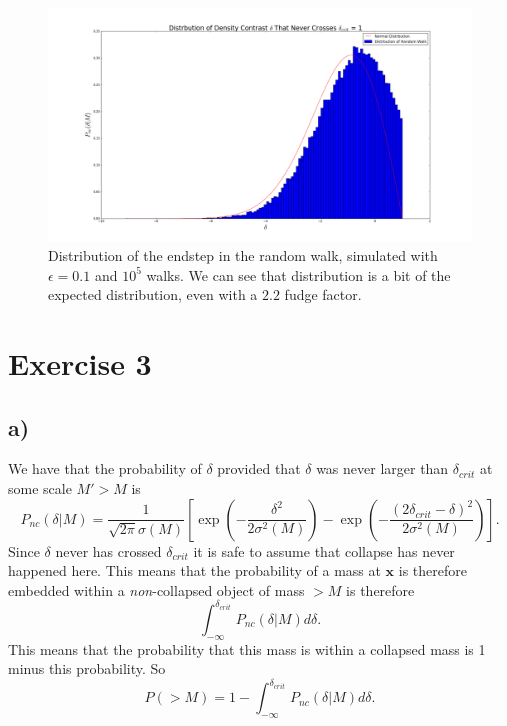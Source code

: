 \documentclass[a4paper,norsk, 10pt]{article}
\begin{document}
\begin{figure}[H]
\centering
\includegraphics[scale=0.3]{dist_under_crit}
\caption{Distribution of the endstep in the random walk, simulated with $\epsilon = 0.1$ and $10^5$ walks. We can see that distribution is a bit of the expected distribution, even with a $2.2$ fudge factor.}\label{fig:restricted_walk}
\end{figure}


\section{Exercise 3}

\subsection{a)}
We have that the probability of $\delta$ provided that $\delta$ was never larger than $\delta_{crit}$ at some scale $M' > M$ is
\begin{equation}\label{eq:Pnc}
P_{nc}(\delta|M) = \frac{1}{\sqrt{2\pi}\sigma(M)}\left[\exp\left(-\frac{\delta^2}{2\sigma^2 (M)}\right)-\exp\left(-\frac{(2\delta_{crit} - \delta)^2}{2\sigma^2 (M)}\right)\right].
\end{equation}
Since $\delta$ never has crossed $\delta_{crit}$ it is safe to assume that collapse has never happened here. This means that the probability of a mass at $\mathbf{x}$ is  therefore  embedded  within  a  \textit{non}-collapsed object of mass $>M$ is therefore
\begin{equation}
\int_{-\infty}^{\delta_{crit}} P_{nc}(\delta|M) d\delta.
\end{equation}
This means that the probability that this mass is within a collapsed mass is 1 minus this probability. So
\begin{equation}\label{eq:Pm}
P(>M) = 1 - \int_{-\infty}^{\delta_{crit}} P_{nc}(\delta|M) d\delta.
\end{equation}
\end{document}
